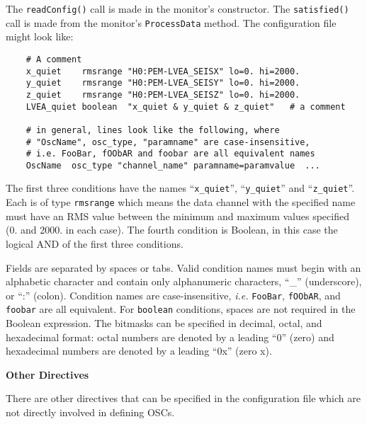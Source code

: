 \documentclass[11pt]{article}
\begin{document}
The \texttt{readConfig()} call is made in the monitor's constructor. The
\texttt{satisfied()} call is made from the monitor's \texttt{ProcessData}
method. The configuration file might look like:

\begin{verbatim}
    # A comment
    x_quiet    rmsrange "H0:PEM-LVEA_SEISX" lo=0. hi=2000.
    y_quiet    rmsrange "H0:PEM-LVEA_SEISY" lo=0. hi=2000.
    z_quiet    rmsrange "H0:PEM-LVEA_SEISZ" lo=0. hi=2000.
    LVEA_quiet boolean  "x_quiet & y_quiet & z_quiet"   # a comment

    # in general, lines look like the following, where
    # "OscName", osc_type, "paramname" are case-insensitive,
    # i.e. FooBar, fOObAR and foobar are all equivalent names
    OscName  osc_type "channel_name" paramname=paramvalue  ...
\end{verbatim}

The first three conditions have the names ``\texttt{x\_quiet}'',
``\texttt{y\_quiet}'' and ``\texttt{z\_quiet}''. Each is of type
\texttt{rmsrange}
which means the data channel with the specified name must have an RMS
value between the minimum and maximum values specified (0. and
2000. in each case).  The fourth condition is Boolean, in this case
the logical AND of the first three conditions.

Fields are separated by spaces or tabs.  Valid condition names must begin
with an alphabetic character and contain only alphanumeric characters,
``\_'' (underscore), or ``:'' (colon). Condition names are case-insensitive, 
\textit{i.e.} \texttt{FooBar}, \texttt{fOObAR}, and \texttt{foobar} are 
all equivalent.  For \texttt{boolean} conditions, spaces are not required 
in the Boolean expression. The bitmasks can be specified in decimal, octal, 
and hexadecimal format: octal numbers are denoted by a leading ``0'' (zero) 
and hexadecimal numbers are denoted by a leading ``0x'' (zero x).

\begin{center}
  \textbf{{\large Other Directives}}
\end{center}

There are other directives that can be specified in the configuration
file which are not directly involved in defining OSCs.
\end{document}
